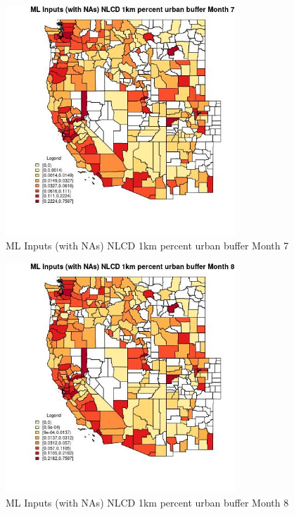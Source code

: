 \begin{figure} 
\centering  
\includegraphics[width=0.77\textwidth]{Code_Outputs/Report_ML_input_PM25_Step4_part_e_de_duplicated_aves_compiled_2019-05-21wNAs_CountyNLCD_1km_percent_urban_buffermedianMonth7.jpg} 
\caption{\label{fig:Report_ML_input_PM25_Step4_part_e_de_duplicated_aves_compiled_2019-05-21wNAsCountyNLCD_1km_percent_urban_buffermedianMonth7}ML Inputs (with NAs) NLCD 1km percent urban buffer Month 7} 
\end{figure} 
 

\begin{figure} 
\centering  
\includegraphics[width=0.77\textwidth]{Code_Outputs/Report_ML_input_PM25_Step4_part_e_de_duplicated_aves_compiled_2019-05-21wNAs_CountyNLCD_1km_percent_urban_buffermedianMonth8.jpg} 
\caption{\label{fig:Report_ML_input_PM25_Step4_part_e_de_duplicated_aves_compiled_2019-05-21wNAsCountyNLCD_1km_percent_urban_buffermedianMonth8}ML Inputs (with NAs) NLCD 1km percent urban buffer Month 8} 
\end{figure} 
 

